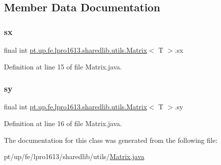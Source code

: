 \subsection{Member Data Documentation}
\hypertarget{classpt_1_1up_1_1fe_1_1lpro1613_1_1sharedlib_1_1utils_1_1_matrix_ad08b31400c1f61080086b12e56e4f31d}{}\label{classpt_1_1up_1_1fe_1_1lpro1613_1_1sharedlib_1_1utils_1_1_matrix_ad08b31400c1f61080086b12e56e4f31d} 
\subsubsection{\texorpdfstring{sx}{sx}}
{\footnotesize\ttfamily final int \hyperlink{classpt_1_1up_1_1fe_1_1lpro1613_1_1sharedlib_1_1utils_1_1_matrix}{pt.\+up.\+fe.\+lpro1613.\+sharedlib.\+utils.\+Matrix}$<$ T $>$.sx}



Definition at line 15 of file Matrix.\+java.

\hypertarget{classpt_1_1up_1_1fe_1_1lpro1613_1_1sharedlib_1_1utils_1_1_matrix_ae47549088ae73a43f9b7da81608debbd}{}\label{classpt_1_1up_1_1fe_1_1lpro1613_1_1sharedlib_1_1utils_1_1_matrix_ae47549088ae73a43f9b7da81608debbd} 
\subsubsection{\texorpdfstring{sy}{sy}}
{\footnotesize\ttfamily final int \hyperlink{classpt_1_1up_1_1fe_1_1lpro1613_1_1sharedlib_1_1utils_1_1_matrix}{pt.\+up.\+fe.\+lpro1613.\+sharedlib.\+utils.\+Matrix}$<$ T $>$.sy}



Definition at line 16 of file Matrix.\+java.



The documentation for this class was generated from the following file\+:\begin{DoxyCompactItemize}
\item 
pt/up/fe/lpro1613/sharedlib/utils/\hyperlink{_matrix_8java}{Matrix.\+java}\end{DoxyCompactItemize}

